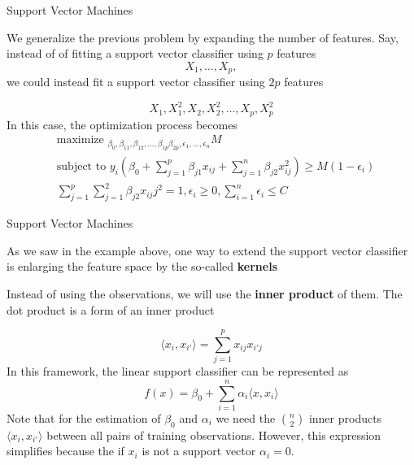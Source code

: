 \documentclass{beamer}
\begin{document}
\begin{frame}{Support Vector Machines}
	
	We generalize the previous problem by expanding the number of features. Say, instead of of fitting a support vector classifier using $p$ features
	\begin{equation*}
		X_1,\ldots, X_p,
	\end{equation*}
we could instead fit a support vector classifier using $2p$ features 

\begin{equation*}
	X_1,X_1^2,X_2,X_2^2,\ldots, X_p,X_p^2
\end{equation*}
In this case, the optimization process becomes
\begin{equation*}
	\begin{split}
		&\textrm{maximize }_{\beta_0,\beta_{11},\beta_{12},\ldots,\beta_{1p} \beta_{2p},\epsilon_1,\ldots,\epsilon_n} M \\
		&\textrm{subject to } y_i (\beta_0 + \sum_{j=1}^p \beta_{j1} x_{ij} + \sum_{j=1}^n \beta_{j2}x_{ij}^2)\ge M (1-\epsilon_i) \\
		&\sum_{j=1}^p \sum_{j=1}^2 \beta_{j2}x_{ij}j^2 =1 ,  \epsilon_i \ge 0, \sum_{i=1}^n \epsilon_i \le C 
	\end{split}
\end{equation*}
\end{frame}

\begin{frame}{Support Vector Machines}
	
	As we saw in the example above,  one way to extend the support vector classifier is enlarging the feature space by the so-called {\bf kernels}
	
	Instead of using the observations, we will use the {\bf inner product}  of them. The dot product is a form of an inner product
	
	\begin{equation*}
		\langle  x_i, x_{i'} \rangle = \sum_{j=1}^p x_{ij} x_{i'j}
	\end{equation*}
	In this framework, the linear support classifier can be represented as
	\begin{equation*}
		f(x) =\beta_0 + \sum_{i=1}^n \alpha_i \langle x,x_i \rangle
	\end{equation*}
Note that for the estimation of $\beta_0$ and $\alpha_i$ we need the $n \choose 2$ inner products $\langle x_i,x_{i'} \rangle$ between all pairs of training observations. However, this expression simplifies because the if $x_i$ is not a support vector $\alpha_i=0$. 
\end{frame}
\end{document}
